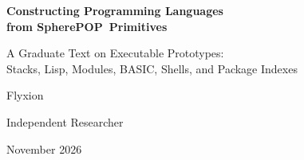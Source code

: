 \documentclass[11pt,oneside]{report}
\newcommand{\SP}{SpherePOP}
\theoremstyle{plain}
\theoremstyle{definition}
\theoremstyle{remark}
\begin{document}
\begin{titlepage}
\centering
\vspace*{2.2cm}
{\LARGE\bfseries Constructing Programming Languages\\[0.4em] from \SP\ Primitives\par}
\vspace{0.9cm}
{\Large A Graduate Text on Executable Prototypes:\\[0.3em] Stacks, Lisp, Modules, BASIC, Shells, and Package Indexes\par}
\vspace{2.2cm}
{\large Flyxion\par}
{\normalsize Independent Researcher\par}
\vspace{1.2cm}
{\normalsize November 2026\par}
\vfill
\end{titlepage}
\tableofcontents
\clearpage
{}
\end{document}
